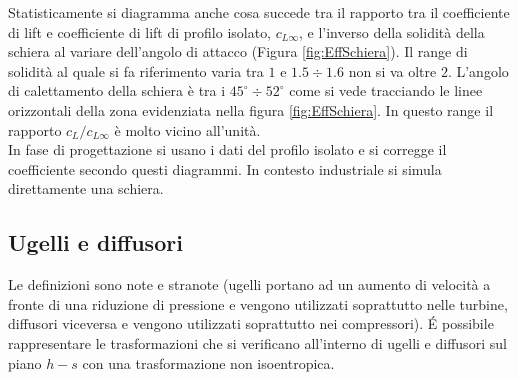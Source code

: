Statisticamente si diagramma anche cosa succede tra il rapporto tra il coefficiente di lift e coefficiente di lift di profilo isolato, $c_{L \infty}$, e l'inverso della solidità della schiera al variare dell'angolo di attacco (Figura \ref{fig:EffSchiera}). Il range di solidità al quale si fa riferimento varia tra $1$ e $ 1.5 \div 1.6$ non si va oltre $2$. L'angolo di calettamento della schiera è tra i $45^{\circ} \div 52^{\circ}$ come si vede tracciando le linee orizzontali della zona evidenziata nella figura \ref{fig:EffSchiera}. In questo range il rapporto $c_L / c_{L \infty}$ è molto vicino all'unità.\\
In fase di progettazione si usano i dati del profilo isolato e si corregge il coefficiente secondo questi diagrammi. In contesto industriale si simula direttamente una schiera.
\subsection{Ugelli e diffusori}
Le definizioni sono note e stranote (ugelli portano ad un aumento di velocità a fronte di una riduzione di pressione e vengono utilizzati soprattutto nelle turbine, diffusori viceversa e vengono utilizzati soprattutto nei compressori). \'E possibile rappresentare le trasformazioni che si verificano all'interno di ugelli e diffusori sul piano $h-s$ con una trasformazione non isoentropica.
